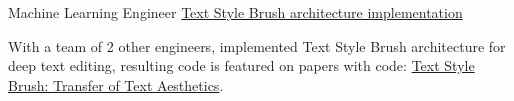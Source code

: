 

\begin{cventries}

  \cventry
  {Machine Learning Engineer} %
  {\href{https://github.com/grenlayk/deep-text-edit}{Text Style Brush architecture implementation}} %
  {} %
  {} %
  {
    \begin{cvitems} %
      \item With a team of 2 other engineers, implemented Text Style Brush architecture for deep text editing, resulting code is featured on papers with code: \href{https://web.archive.org/web/20240412013814/https://paperswithcode.com/paper/textstylebrush-transfer-of-text-aesthetics}{Text Style Brush: Transfer of Text Aesthetics}.
    \end{cvitems}
  }

\end{cventries}
